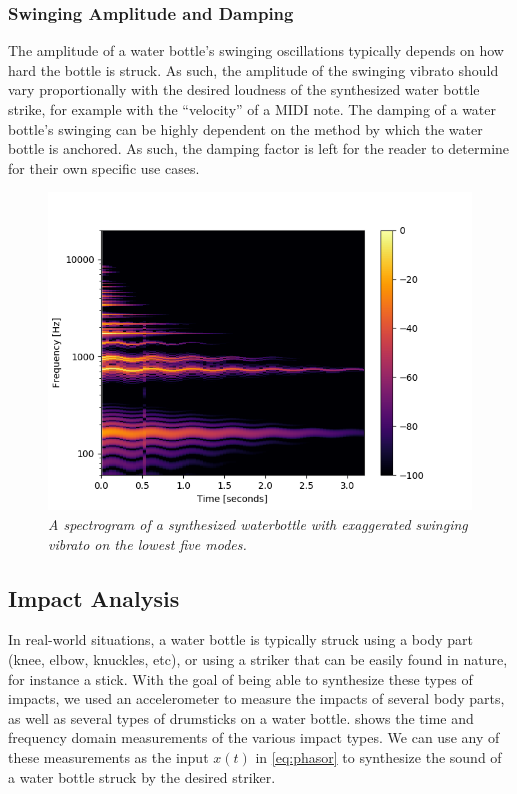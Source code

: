 \documentclass[twoside,a4paper]{article}
\begin{document}
\subsubsection{Swinging Amplitude and Damping}
%
The amplitude of a water bottle's swinging oscillations typically depends
on how hard the bottle is struck. As such, the amplitude of the swinging
vibrato should vary proportionally with the desired loudness of the synthesized water bottle strike, for example with the ``velocity'' of a MIDI note.
The damping of a water bottle's swinging can be highly dependent on the method
by which the water bottle is anchored. As such, the damping factor is left
for the reader to determine for their own specific use cases.
%
\begin{figure}
    \centering
    \includegraphics[width=\linewidth,trim={0 0 1cm 1cm},clip]{../Figures/Specgrams/Vibrato.png}
    \caption{\it{A spectrogram of a synthesized waterbottle with exaggerated swinging vibrato on the lowest five modes.}}
    \label{fig:swinging-vibrato}
\end{figure}

%
\subsection{Impact Analysis} \label{sec:impact}
%
In real-world situations, a water bottle is typically struck using a body part
(knee, elbow, knuckles, etc), or using a striker that can be easily found in
nature, for instance a stick. With the goal of being able to synthesize these
types of impacts, we used an accelerometer to measure the impacts of
several body parts, as well as several types of drumsticks on a water bottle.
 shows the time and frequency domain
measurements of the various impact types. We can use any of these measurements as the input $x(t)$ in \eqref{eq:phasor} to synthesize the sound of a water bottle struck by the desired striker.
\end{document}
